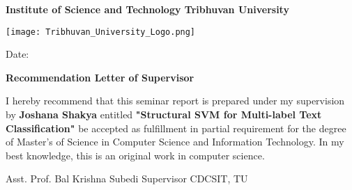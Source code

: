 \begin{center}
\textbf{
\large
Institute of Science and Technology
\linebreak
Tribhuvan University
}
\end{center}

\vspace{2cm}

\begin{center}
\texttt{[image: Tribhuvan\_University\_Logo.png]}
\end{center}

\begin{flushright}
Date: \dottedline{4cm}
\end{flushright}

\vspace{2cm}

\begin{center}
\textbf{Recommendation Letter of Supervisor}
\end{center}

\vspace{1cm}

I hereby recommend that this seminar report is prepared under my supervision by \textbf{Joshana Shakya} entitled \textbf{"Structural SVM for Multi-label Text Classification"} be accepted as fulfillment in partial requirement for the degree of Master's of Science in Computer Science and Information Technology. In my best knowledge, this is an original work in computer science.

\vspace{3cm}

\begin{flushleft}
\dottedline{5.8cm} \newline
Asst. Prof. Bal Krishna Subedi \newline
Supervisor \newline
CDCSIT, TU \newline
\end{flushleft}

\clearpage